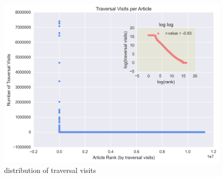 \documentclass[twoside]{article}
\begin{document}
\begin{figure}[H]
\centering
    \caption{distribution of traversal visits}
        \includegraphics[width=\textwidth]{graphics/traversals_per_article.png}
\end{figure}
\end{document}
